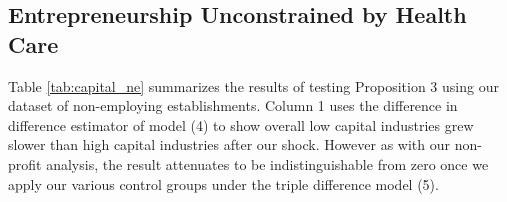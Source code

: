 \documentclass[12pt]{article}
\begin{document}
\begin{comment}

\multicolumn{4}{l}{\footnotesize Column (1) is a diff-in-diff model of non-employers per million people in Massachusetts from  }\\ 
\multicolumn{4}{l}{\footnotesize \space 2000 to 2012 with treatment after 2007 and treatment intensity equal to percentage of non-profit firms within industry.}\\ 
\multicolumn{4}{l}{\footnotesize Non-profit industries defined by 4 digit NAICS codes where over half of firms were tax-exempt }\\
\multicolumn{4}{l}{\footnotesize  \space according to 2007 Economic Census data.}\\
\multicolumn{4}{l}{\footnotesize Maine, Connecticut, Vermont, Rhode Island and New Hampshire used as controls in column (2) }\\
\multicolumn{4}{l}{\footnotesize \space under triple diff model. }\\
\multicolumn{4}{l}{\footnotesize Column (3) restricts the dataset to counties that border other states across Massachusetts, }\\
\multicolumn{4}{l}{\footnotesize \space Connecticut, Vermont, Rhode Island, New Hampshire and New York. }\\
\multicolumn{4}{l}{\footnotesize Column (4) uses a synthetic control model that matches each Massachuetts industry by county }\\
\multicolumn{4}{l}{\footnotesize \space pre-trend against US counties with similar income, age, urban and insurance rate characteristics. }\\

\begin{table}[H]
	\centering
	
	\caption{Impact of health reform on non-profit entrepreneurship}
\end{table}

\end{comment}

\subsection{Entrepreneurship Unconstrained by Health Care}

Table \ref{tab:capital_ne} summarizes the results of testing Proposition 3 using our dataset of non-employing establishments. Column 1 uses the difference in difference estimator of model (4) to show overall low capital industries grew slower than high capital industries after our shock. However as with our non-profit analysis, the result attenuates to be indistinguishable from zero once we apply our various control groups under the triple difference model (5). 
\end{document}
